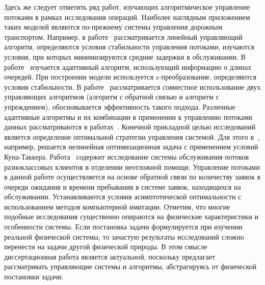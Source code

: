 Здесь же следует отметить ряд работ, изучающих алгоритмическое управление потоками в рамках исследования операций. Наиболее наглядным приложением таких моделей являются по-прежнему системы управления дорожным транспортом. Например, в работе~\cite{Dunne1964} рассматривается линейный управляющий алгоритм, определяются условия стабильности управления потоками, изучаются условия, при которых минимизируются средние задержки в обслуживании. В работе~\cite{Gordon1969} изучается адаптивный алгоритм, использующий информацию о длинах очередей. При построении модели используется z-преобразование, определяются условия стабильности. В работе~\cite{Day2012} рассматривается совместное использование двух управляющих алгоритмов (алгоритм с обратной связью и алгоритм с упреждением), обосновывается эффективность такого подхода.  Различные адаптивные алгоритмы и их комбинации в применении к управлению потоками данных рассматриваются в работах~\cite{Vasilakos1990,Cotton1995,Mason1999,Kokkonis2016}. Конечной прикладной целью исследований является определение оптимальной стратегии управления системой. Для этого в~\cite{Mason1999}, например, решается нелинейная оптимизационная задача с применением условий Куна-Таккера. Работа~\cite{Huang2015} содержит исследование системы обслуживания потоков разноклассовых клиентов в отделении неотложной помощи. Управление потоками в данной работе осуществляется на основе обратной связи по количеству заявок в очереди ожидания и времени пребывания в системе заявок, находящихся на обслуживании. Устанавливаются  условия асимптотической оптимальности с использованием методов компьютерной имитации. Отметим, что многие подобные исследования существенно опираются на физические характеристики и особенности системы. Если постановка задачи формулируется при изучении реальной физической системы, то зачастую результаты исследований сложно перенести на задачи другой физической природы. В этом смысле диссертационная работа является актуальной, поскольку предлагает рассматривать управляющие системы и алгоритмы, абстрагируясь от физической постановки задачи.


